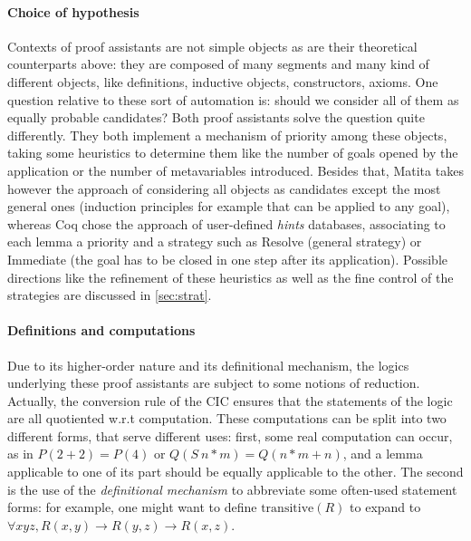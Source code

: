\documentclass[twoside,a4paper,12pt]{article}
\begin{document}
\paragraph{Choice of hypothesis}

Contexts of proof assistants are not simple objects as are their
theoretical counterparts above: they are composed of many segments and
many kind of different objects, like definitions, inductive objects,
constructors, axioms. One question relative to these sort of
automation is: should we consider all of them as equally probable
candidates? Both proof assistants solve the question quite
differently. They both implement a mechanism of priority among these
objects, taking some heuristics to determine them like the number of
goals opened by the application or the number of metavariables
introduced. Besides that, \textsf{Matita} takes however the approach
of considering all objects as candidates except the most general ones
(induction principles for example that can be applied to any goal),
whereas \textsf{Coq} chose the approach of user-defined \emph{hints}
databases, associating to each lemma a priority and a strategy such as
\textsf{Resolve} (general strategy) or \textsf{Immediate} (the goal
has to be closed in one step after its application). Possible
directions like the refinement of these heuristics as well as the fine
control of the strategies are discussed in \ref{sec:strat}.

\paragraph{Definitions and computations} 

Due to its higher-order nature and its definitional mechanism, the
logics underlying these proof assistants are subject to some notions
of reduction. Actually, the conversion rule of the CIC ensures that
the statements of the logic are all quotiented w.r.t computation.
These computations can be split into two different forms, that serve
different uses: first, some real computation can occur, as in $P(2+2)
= P(4)$ or $Q(S\ n * m) = Q(n * m + n)$, and a lemma applicable to one
of its part should be equally applicable to the other. The second is
the use of the \emph{definitional mechanism} to abbreviate some
often-used statement forms: for example, one might want to define
$\mathrm{transitive}(R)$ to expand to $\forall xyz, R(x,y) \to
R(y,z)\to R(x,z)$.
\end{document}
